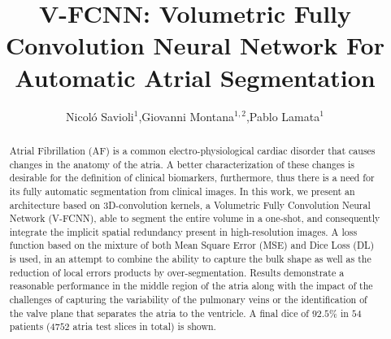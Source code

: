 \documentclass{llncs}
\begin{document}
% 
%
\pagestyle{headings}  %
%
%
\mainmatter              %
%
\title{V-FCNN: Volumetric Fully Convolution Neural Network For Automatic Atrial Segmentation}

\author{Nicol\'o Savioli$^{1}$,Giovanni Montana$^{1,2}$,Pablo Lamata$^{1}$}%





\maketitle

\begin{abstract}

Atrial Fibrillation (AF) is a common electro-physiological cardiac disorder that causes changes in the anatomy of the atria. A better characterization of these changes is desirable for the definition of clinical biomarkers, furthermore, thus there is a need for its fully automatic segmentation from clinical images.  
In this work, we present an architecture based on 3D-convolution kernels, a Volumetric Fully Convolution Neural Network (V-FCNN), 
able to segment the entire volume in a one-shot, and consequently integrate the implicit spatial redundancy present in high-resolution images. A loss function based on the mixture of both Mean Square Error (MSE) and Dice Loss (DL) is used, in an attempt to combine the ability to capture the bulk shape as well as the reduction of local errors products by over-segmentation. Results demonstrate a reasonable performance in the middle region of the atria along with the impact of the challenges of capturing the variability of the pulmonary veins or the identification of the valve plane that separates the atria to the ventricle. A final dice of $92.5\%$ in $54$ patients ($4752$ atria test slices in total) is shown.

\end{abstract}
\end{document}
